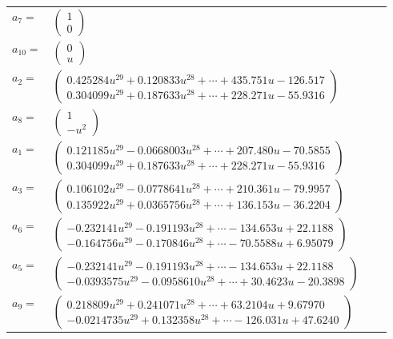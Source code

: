 \documentclass[1p]{elsarticle_modified}
\theoremstyle{definition}
\begin{document}
\begin{tabular}{m{7pt} m{180pt} m{7pt} m{180pt} }
\flushright $a_{7}=$&$\begin{pmatrix}1\\0\end{pmatrix}$ \\
\flushright $a_{10}=$&$\begin{pmatrix}0\\u\end{pmatrix}$ \\
\flushright $a_{2}=$&$\begin{pmatrix}0.425284 u^{29}+0.120833 u^{28}+\cdots+435.751 u-126.517\\0.304099 u^{29}+0.187633 u^{28}+\cdots+228.271 u-55.9316\end{pmatrix}$ \\
\flushright $a_{8}=$&$\begin{pmatrix}1\\- u^2\end{pmatrix}$ \\
\flushright $a_{1}=$&$\begin{pmatrix}0.121185 u^{29}-0.0668003 u^{28}+\cdots+207.480 u-70.5855\\0.304099 u^{29}+0.187633 u^{28}+\cdots+228.271 u-55.9316\end{pmatrix}$ \\
\flushright $a_{3}=$&$\begin{pmatrix}0.106102 u^{29}-0.0778641 u^{28}+\cdots+210.361 u-79.9957\\0.135922 u^{29}+0.0365756 u^{28}+\cdots+136.153 u-36.2204\end{pmatrix}$ \\
\flushright $a_{6}=$&$\begin{pmatrix}-0.232141 u^{29}-0.191193 u^{28}+\cdots-134.653 u+22.1188\\-0.164756 u^{29}-0.170846 u^{28}+\cdots-70.5588 u+6.95079\end{pmatrix}$ \\
\flushright $a_{5}=$&$\begin{pmatrix}-0.232141 u^{29}-0.191193 u^{28}+\cdots-134.653 u+22.1188\\-0.0393575 u^{29}-0.0958610 u^{28}+\cdots+30.4623 u-20.3898\end{pmatrix}$ \\
\flushright $a_{9}=$&$\begin{pmatrix}0.218809 u^{29}+0.241071 u^{28}+\cdots+63.2104 u+9.67970\\-0.0214735 u^{29}+0.132358 u^{28}+\cdots-126.031 u+47.6240\end{pmatrix}$ \\

\end{tabular}
\end{document}
